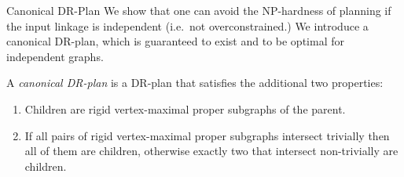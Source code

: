 \documentclass{beamer}
\newcommand{\dfn}[1]{\alert{\textit{#1}}} %
\newcommand{\closure}[1]{\left<#1\right>}
\def\matroid{\mathcal{M}}
\def\RR{\mathbb{R}}
\begin{document}
\begin{frame}{Canonical DR-Plan}
    We show that one can avoid the NP-hardness of planning if the input linkage is independent (i.e.\ not overconstrained.)
\n
    We introduce a canonical DR-plan, which is guaranteed to exist and to be optimal for independent graphs.
\n



    \begin{definition}
        A \dfn{canonical DR-plan} is a DR-plan that satisfies the additional two properties:
        \begin{enumerate}
            \item Children are rigid vertex-maximal proper subgraphs of the parent.
            \item If all pairs of rigid vertex-maximal proper subgraphs intersect trivially then all of them are children, otherwise exactly two that intersect non-trivially are children.
        \end{enumerate}
    \end{definition}


\end{frame}
\end{document}
